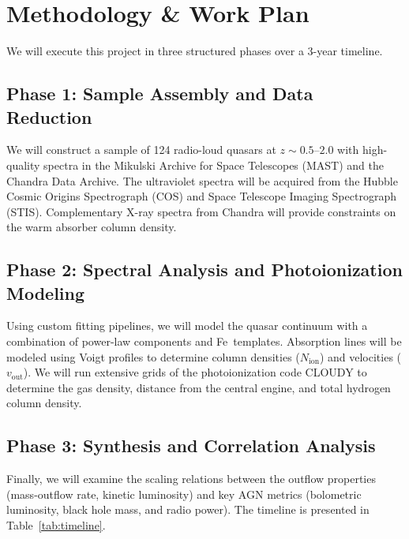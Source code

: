 \section{Methodology \& Work Plan}
We will execute this project in three structured phases over a 3-year timeline.

\subsection{Phase 1: Sample Assembly and Data Reduction}
We will construct a sample of 124 radio-loud quasars at $z \sim 0.5$--$2.0$ with high-quality spectra in the Mikulski Archive for Space Telescopes (MAST) and the Chandra Data Archive. The ultraviolet spectra will be acquired from the Hubble Cosmic Origins Spectrograph (COS) and Space Telescope Imaging Spectrograph (STIS). Complementary X-ray spectra from Chandra will provide constraints on the warm absorber column density.

\subsection{Phase 2: Spectral Analysis and Photoionization Modeling}
Using custom fitting pipelines, we will model the quasar continuum with a combination of power-law components and Fe\, templates. Absorption lines will be modeled using Voigt profiles to determine column densities ($N_{\text{ion}}$) and velocities ($v_{\text{out}}$). We will run extensive grids of the photoionization code CLOUDY to determine the gas density, distance from the central engine, and total hydrogen column density.

\subsection{Phase 3: Synthesis and Correlation Analysis}
Finally, we will examine the scaling relations between the outflow properties (mass-outflow rate, kinetic luminosity) and key AGN metrics (bolometric luminosity, black hole mass, and radio power). The timeline is presented in Table~\ref{tab:timeline}.

